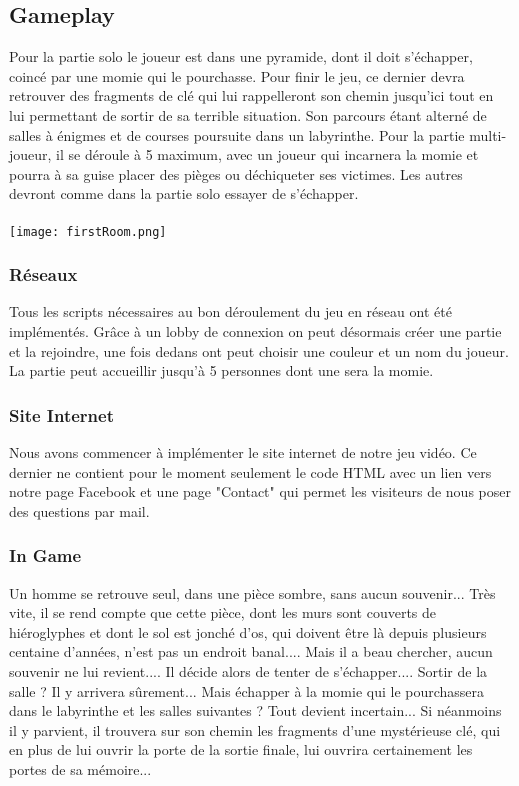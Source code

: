 \documentclass[12pt,a4paper]{article}
\begin{document}
\newpage
\subsection{Gameplay}
Pour la partie solo le joueur est dans une pyramide, dont il doit s'échapper, coincé par une momie qui le pourchasse. Pour finir le jeu, ce dernier devra retrouver des fragments de clé qui lui rappelleront son chemin jusqu'ici tout en lui permettant de sortir de sa terrible situation. Son parcours étant alterné de salles à énigmes et de courses poursuite dans un labyrinthe.
Pour la partie multi-joueur, il se déroule à 5 maximum, avec un joueur qui incarnera la momie et pourra à sa guise placer des pièges ou déchiqueter ses victimes.
Les autres devront comme dans la partie solo essayer de s'échapper.
\paragraph{}
\texttt{[image: firstRoom.png]}
\newpage
\subsubsection{Réseaux}
Tous les scripts nécessaires au bon déroulement du jeu en réseau ont été implémentés. Grâce à un lobby de connexion on peut désormais créer une partie et la rejoindre, une fois dedans ont peut choisir une couleur et un nom du joueur.
La partie peut accueillir jusqu'à 5 personnes dont une sera la momie.

\subsubsection{Site Internet}
Nous avons commencer à implémenter le site internet de notre jeu vidéo. Ce dernier ne contient pour le moment seulement le code HTML avec un lien vers notre page Facebook et une page "Contact" qui permet les visiteurs de nous poser des questions par mail.
\newpage
\subsubsection{In Game}
Un homme se retrouve seul, dans une pièce sombre, sans aucun souvenir...
Très vite, il se rend compte que cette pièce, dont les murs sont couverts de hiéroglyphes et dont le sol est jonché d'os, qui doivent être là depuis plusieurs centaine d'années, n'est pas un endroit banal....
Mais il a beau chercher, aucun souvenir ne lui revient....
Il décide alors de tenter de s'échapper....
Sortir de la salle ? Il y arrivera sûrement... Mais échapper à la momie qui le pourchassera dans le labyrinthe et les salles suivantes ? Tout devient incertain...
Si néanmoins il y parvient, il trouvera sur son chemin les fragments d'une mystérieuse clé, qui en plus de lui ouvrir la porte de la sortie finale, lui ouvrira certainement les portes de sa mémoire...
\end{document}
